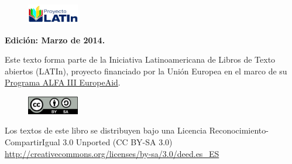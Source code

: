 \null
\vfill

{\parindent0pt

\begin{figure}[h!]
    \includegraphics[width=0.2\textwidth]{Pictures/logolatin.jpg}
\end{figure}
\textbf{Edici\'on: Marzo de 2014.}

Este texto forma parte de la Iniciativa Latinoamericana de Libros de Texto abiertos (LATIn), proyecto financiado por la Uni\'on Europea en el marco de su \href{http://www.alfa3programme.eu/es/projects/project/39-LATIN---Iniciativa-latinoamericana-de-libros-de-texto-abiertos}{Programa ALFA III EuropeAid}.

\begin{figure}[h!]
    \includegraphics[width=0.2\textwidth]{Pictures/creativecommons.png}
\end{figure}

Los textos de este libro se distribuyen bajo una Licencia Reconocimiento-CompartirIgual 3.0 Unported (CC BY-SA 3.0) \url{http://creativecommons.org/licenses/by-sa/3.0/deed.es_ES}

}

